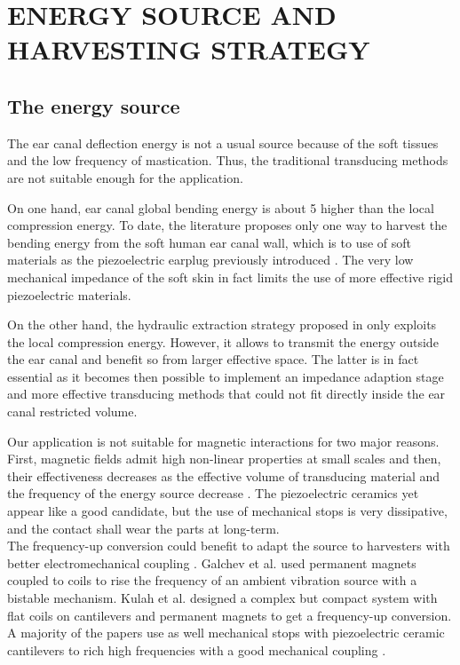 \documentclass[3p,twocolumn,preprint]{elsarticle}
\begin{document}
\section{ENERGY SOURCE AND HARVESTING STRATEGY}
\label{sec:THE ENERGY SOURCE AND HARVESTING STRATEGY}
	\subsection{The energy source}	
	\label{The energy source}
The ear canal deflection energy is not a usual source because of the soft tissues and the low frequency of mastication. Thus, the traditional transducing methods are not suitable enough for the application.

On one hand, ear canal global bending energy is about 5 higher than the local compression energy. To date, the literature proposes only one way to harvest the bending energy from the soft human ear canal wall, which is to use of soft materials as the piezoelectric earplug previously introduced \cite{Delnavaz2013}. The very low mechanical impedance of the soft skin in fact limits the use of more effective rigid piezoelectric materials.

On the other hand, the hydraulic extraction strategy proposed in \cite{Delnavaz2012} only exploits the local compression energy. However, it allows to transmit the energy outside the ear canal and benefit so from larger effective space. The latter is in fact essential as it becomes then possible to implement an impedance adaption stage and more effective transducing methods that could not fit directly inside the ear canal restricted volume.

Our application is not suitable for magnetic interactions for two major reasons. First, magnetic fields admit high non-linear properties at small scales and then, their effectiveness decreases as the effective volume  of transducing material and the frequency of the energy source decrease \cite{Priya2017,Kulah2008}. The piezoelectric ceramics yet appear like a good candidate, but the use of mechanical stops is very dissipative, and the contact shall wear the parts at long-term.\\

The frequency-up conversion could benefit to adapt the source to harvesters with better electromechanical coupling \cite{Ashraf2011}. Galchev et al. \cite{Galchev2009} used permanent magnets coupled to coils to rise the frequency of an ambient vibration source with a bistable mechanism. Kulah et al. \cite{Kulah2008} designed a complex but compact system with flat coils on cantilevers and permanent magnets to get a frequency-up conversion. A majority of the papers use as well mechanical stops with piezoelectric ceramic cantilevers to rich high frequencies with a good mechanical coupling \cite{Edwards2013,Gu2011,Lee2007}. 
\end{document}

